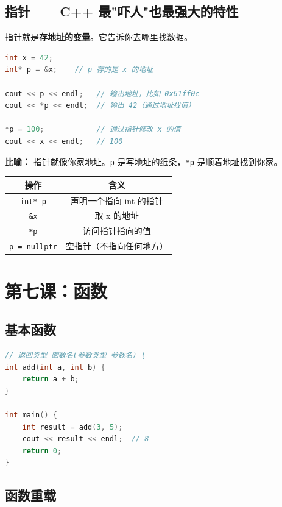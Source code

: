 \documentclass[a4paper,12pt]{ctexart}
\begin{document}
\subsection*{指针——C++ 最"吓人"也最强大的特性}

指针就是\textbf{存地址的变量}。它告诉你去哪里找数据。

\begin{lstlisting}[language=C++]
int x = 42;
int* p = &x;    // p 存的是 x 的地址

cout << p << endl;   // 输出地址，比如 0x61ff0c
cout << *p << endl;  // 输出 42（通过地址找值）

*p = 100;            // 通过指针修改 x 的值
cout << x << endl;   // 100
\end{lstlisting}

\textbf{比喻：} 指针就像你家地址。\texttt{p} 是写地址的纸条，\texttt{*p} 是顺着地址找到你家。

\begin{center}
\begin{tabular}{|c|c|}
\hline
\textbf{操作} & \textbf{含义} \\ \hline
\texttt{int* p} & 声明一个指向 int 的指针 \\ \hline
\texttt{\&x} & 取 x 的地址 \\ \hline
\texttt{*p} & 访问指针指向的值 \\ \hline
\texttt{p = nullptr} & 空指针（不指向任何地方） \\ \hline
\end{tabular}
\end{center}

\section*{第七课：函数}

\subsection*{基本函数}

\begin{lstlisting}[language=C++]
// 返回类型 函数名(参数类型 参数名) {
int add(int a, int b) {
    return a + b;
}

int main() {
    int result = add(3, 5);
    cout << result << endl;  // 8
    return 0;
}
\end{lstlisting}

\subsection*{函数重载}
\end{document}
